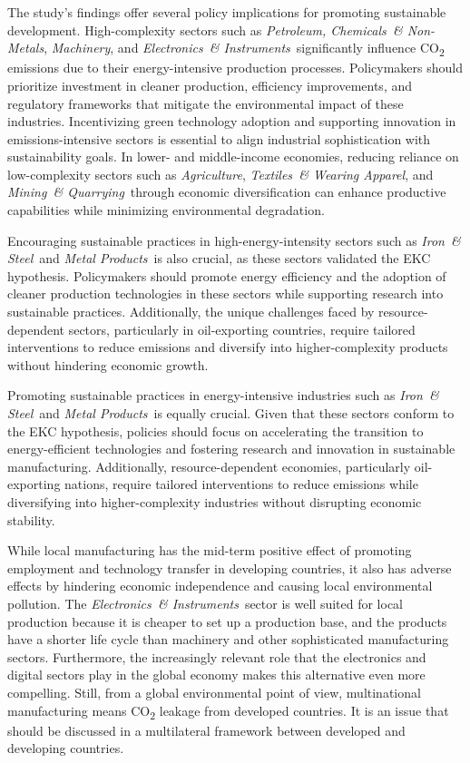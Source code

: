 \documentclass[10pt]{article}
\newcommand{\AG}{\textit{Agriculture}}
\newcommand{\EL}{\textit{Electronics~\& Instruments}}
\newcommand{\IR}{\textit{Iron~\& Steel}}
\newcommand{\MA}{\textit{Machinery}}
\newcommand{\ME}{\textit{Metal Products}}
\newcommand{\MI}{\textit{Mining~\& Quarrying}}
\newcommand{\PE}{\textit{Petroleum, Chemicals~\& Non-Metals}}
\newcommand{\TE}{\textit{Textiles~\& Wearing Apparel}}
\begin{document}
The study's findings offer several policy implications for promoting sustainable development. High-complexity sectors such as \PE, \MA, and \EL\ significantly influence CO\textsubscript{2} emissions due to their energy-intensive production processes. Policymakers should prioritize investment in cleaner production, efficiency improvements, and regulatory frameworks that mitigate the environmental impact of these industries. Incentivizing green technology adoption and supporting innovation in emissions-intensive sectors is essential to align industrial sophistication with sustainability goals. In lower- and middle-income economies, reducing reliance on low-complexity sectors such as \AG, \TE, and \MI\ through economic diversification can enhance productive capabilities while minimizing environmental degradation.

Encouraging sustainable practices in high-energy-intensity sectors such as \IR\ and \ME\ is also crucial, as these sectors validated the EKC hypothesis. Policymakers should promote energy efficiency and the adoption of cleaner production technologies in these sectors while supporting research into sustainable practices. Additionally, the unique challenges faced by resource-dependent sectors, particularly in oil-exporting countries, require tailored interventions to reduce emissions and diversify into higher-complexity products without hindering economic growth.

Promoting sustainable practices in energy-intensive industries such as \IR\ and \ME\ is equally crucial. Given that these sectors conform to the EKC hypothesis, policies should focus on accelerating the transition to energy-efficient technologies and fostering research and innovation in sustainable manufacturing. Additionally, resource-dependent economies, particularly oil-exporting nations, require tailored interventions to reduce emissions while diversifying into higher-complexity industries without disrupting economic stability.

While local manufacturing has the mid-term positive effect of promoting employment and technology transfer in developing countries, it also has adverse effects by hindering economic independence and causing local environmental pollution. The \EL\ sector is well suited for local production because it is cheaper to set up a production base, and the products have a shorter life cycle than machinery and other sophisticated manufacturing sectors. Furthermore, the increasingly relevant role that the electronics and digital sectors play in the global economy makes this alternative even more compelling. Still, from a global environmental point of view, multinational manufacturing means CO\textsubscript{2} leakage from developed countries. It is an issue that should be discussed in a multilateral framework between developed and developing countries.
\end{document}
